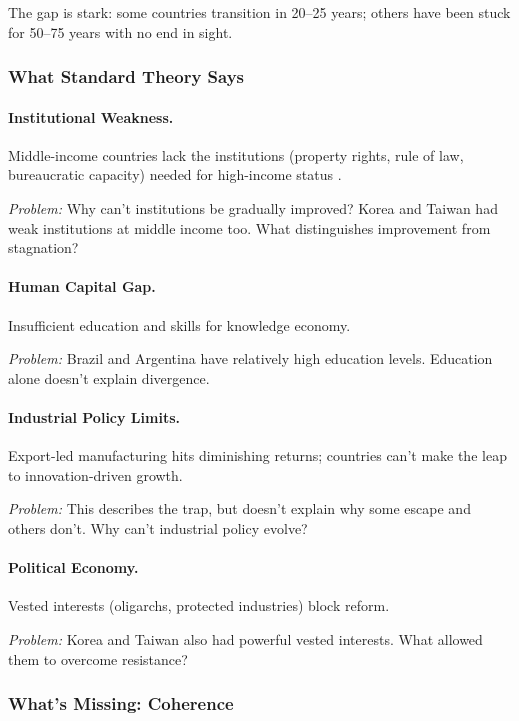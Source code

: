 The gap is stark: some countries transition in 20--25 years; others have been 
stuck for 50--75 years with no end in sight.

\subsubsection{What Standard Theory Says}

\paragraph{Institutional Weakness.}
Middle-income countries lack the institutions (property rights, rule of law, 
bureaucratic capacity) needed for high-income status \citep{acemoglu2012whynations}.

\textit{Problem:} Why can't institutions be gradually improved? Korea and Taiwan 
had weak institutions at middle income too. What distinguishes improvement from stagnation?

\paragraph{Human Capital Gap.}
Insufficient education and skills for knowledge economy.

\textit{Problem:} Brazil and Argentina have relatively high education levels. 
Education alone doesn't explain divergence.

\paragraph{Industrial Policy Limits.}
Export-led manufacturing hits diminishing returns; countries can't make the 
leap to innovation-driven growth.

\textit{Problem:} This describes the trap, but doesn't explain why some escape 
and others don't. Why can't industrial policy evolve?

\paragraph{Political Economy.}
Vested interests (oligarchs, protected industries) block reform.

\textit{Problem:} Korea and Taiwan also had powerful vested interests. What 
allowed them to overcome resistance?

\subsubsection{What's Missing: Coherence}

